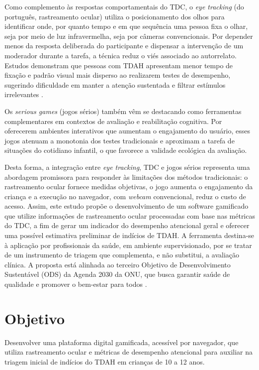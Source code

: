 \documentclass[11pt,a4paper]{article}
\begin{document}
Como complemento às respostas comportamentais do TDC, o \textit{eye tracking} (do português, rastreamento ocular) utiliza o posicionamento dos olhos para identificar onde, por quanto tempo e em que sequência uma pessoa fixa o olhar, seja por meio de luz infravermelha, seja por câmeras convencionais. Por depender menos da resposta deliberada do participante e dispensar a intervenção de um moderador durante a tarefa, a técnica reduz o viés associado ao autorrelato. Estudos demonstram que pessoas com TDAH apresentam menor tempo de fixação e padrão visual mais disperso ao realizarem testes de desempenho, sugerindo dificuldade em manter a atenção sustentada e filtrar estímulos irrelevantes \cite{Lim2024}.

Os \textit{serious games} (jogos sérios) também vêm se destacando como ferramentas complementares em contextos de avaliação e reabilitação cognitiva. Por oferecerem ambientes interativos que aumentam o engajamento do usuário, esses jogos atenuam a monotonia dos testes tradicionais e aproximam a tarefa de situações do cotidiano infantil, o que favorece a validade ecológica da avaliação.

Desta forma, a integração entre \textit{eye tracking}, TDC e jogos sérios representa uma abordagem promissora para responder às limitações dos métodos tradicionais: o rastreamento ocular fornece medidas objetivas, o jogo aumenta o engajamento da criança e a execução no navegador, com \textit{webcam} convencional, reduz o custo de acesso. Assim, este estudo propõe o desenvolvimento de um software gamificado que utilize informações de rastreamento ocular processadas com base nas métricas do TDC, a fim de gerar um indicador do desempenho atencional geral e oferecer uma possível estimativa preliminar de indícios de TDAH. A ferramenta destina-se à aplicação por profissionais da saúde, em ambiente supervisionado, por se tratar de um instrumento de triagem que complementa, e não substitui, a avaliação clínica. A proposta está alinhada ao terceiro Objetivo de Desenvolvimento Sustentável (ODS) da Agenda 2030 da ONU, que busca garantir saúde de qualidade e promover o bem-estar para todos \cite{UN2030}.

\section{Objetivo}
Desenvolver uma plataforma digital gamificada, acessível por navegador, que utiliza
rastreamento ocular e métricas de desempenho atencional para auxiliar na triagem inicial de
indícios do TDAH em crianças de 10 a 12 anos.
\end{document}
